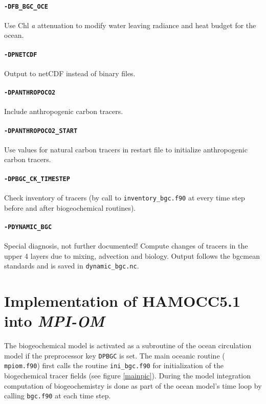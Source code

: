 \documentclass[11pt,a4paper,fleqn,twoside]{article}
\newcommand{\ham}{HAMOCC5.1\,}
\begin{document}
\paragraph{\tt -DFB\_BGC\_OCE} Use Chl {\it a} attenuation to modify water leaving
radiance and heat budget for the ocean.

\paragraph{\tt -DPNETCDF} Output to netCDF instead of binary files. 

\paragraph{\tt -DPANTHROPOCO2} Include anthropogenic carbon tracers. 

\paragraph{\tt -DPANTHROPOCO2\_START} Use values for natural carbon tracers in
restart file to initialize anthropogenic carbon tracers. 

\paragraph{\tt -DPBGC\_CK\_TIMESTEP} Check inventory of tracers (by call to
{\tt inventory\_bgc.f90} at every time step before and after biogeochemical
routines). 

\paragraph{\tt -PDYNAMIC\_BGC} Special diagnosis, not further documented! 
Compute changes of tracers in the upper 4 layers
due to mixing, advection and biology. Output follows the bgcmean standards and is saved in {\tt dynamic\_bgc.nc}.


\section{\label{implementation}Implementation of \ham into {\em MPI-OM}}

The biogeochemical model is activated as a subroutine of the ocean circulation model 
if the preprocessor key {\tt \-DPBGC} is set. The main oceanic routine ({\tt
mpiom.f90}) first calls the routine {\tt ini\_bgc.f90} for initialization of 
the biogechemical tracer fields (see figure \ref{mainpic}). 
During the model integration computation of biogeochemistry 
is done as part of the ocean model's time loop by calling {\tt bgc.f90} at each time step. 
\end{document}
